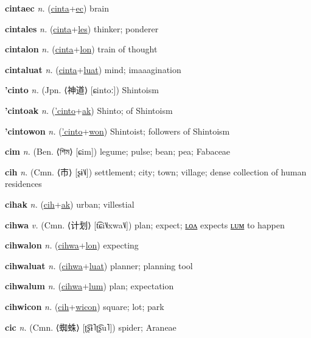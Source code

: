 \textbf{\hypertarget{cintaec}{cintaec}} \textit{n.} (\hyperlink{cinta}{cinta}+\allowbreak \hyperlink{ec}{ec})
brain

\textbf{\hypertarget{cintales}{cintales}} \textit{n.} (\hyperlink{cinta}{cinta}+\allowbreak \hyperlink{les}{les})
thinker; ponderer

\textbf{\hypertarget{cintalon}{cintalon}} \textit{n.} (\hyperlink{cinta}{cinta}+\allowbreak \hyperlink{lon}{lon})
train of thought

\textbf{\hypertarget{cintaluat}{cintaluat}} \textit{n.} (\hyperlink{cinta}{cinta}+\allowbreak \hyperlink{luat}{luat})
mind; imaaagination

\textbf{\hypertarget{'cinto}{'cinto}} \textit{n.} (Jpn. ⟨{\japanese{}神道}⟩ [ɕintoː])
Shintoism

\textbf{\hypertarget{'cintoak}{'cintoak}} \textit{n.} (\hyperlink{'cinto}{'cinto}+\allowbreak \hyperlink{ak}{ak})
Shinto; of Shintoism

\textbf{\hypertarget{'cintowon}{'cintowon}} \textit{n.} (\hyperlink{'cinto}{'cinto}+\allowbreak \hyperlink{won}{won})
Shintoist; followers of Shintoism

\textbf{\hypertarget{cim}{cim}} \textit{n.} (Ben. ⟨{\bengali{}শিম}⟩ [ɕim])
legume; pulse; bean; pea; Fabaceae

\textbf{\hypertarget{cih}{cih}} \textit{n.} (Cmn. ⟨{\chinese{}市}⟩ [ʂɨ˥˩])
settlement; city; town; village; dense collection of human residences

\textbf{\hypertarget{cihak}{cihak}} \textit{n.} (\hyperlink{cih}{cih}+\allowbreak \hyperlink{ak}{ak})
urban; villestial

\textbf{\hypertarget{cihwa}{cihwa}} \textit{v.} (Cmn. ⟨{\chinese{}计划}⟩ [t͡ɕi˥˩xwa˥˩])
plan; expect; \hyperlink{cihwalon}{ʟᴏᴧ} expects \hyperlink{cihwalum}{ʟᴜᴍ} to happen

\textbf{\hypertarget{cihwalon}{cihwalon}} \textit{n.} (\hyperlink{cihwa}{cihwa}+\allowbreak \hyperlink{lon}{lon})
expecting

\textbf{\hypertarget{cihwaluat}{cihwaluat}} \textit{n.} (\hyperlink{cihwa}{cihwa}+\allowbreak \hyperlink{luat}{luat})
planner; planning tool

\textbf{\hypertarget{cihwalum}{cihwalum}} \textit{n.} (\hyperlink{cihwa}{cihwa}+\allowbreak \hyperlink{lum}{lum})
plan; expectation

\textbf{\hypertarget{cihwicon}{cihwicon}} \textit{n.} (\hyperlink{cih}{cih}+\allowbreak \hyperlink{wicon}{wicon})
square; lot; park

\textbf{\hypertarget{cic}{cic}} \textit{n.} (Cmn. ⟨{\chinese{}蜘蛛}⟩ [ʈ͡ʂɨ˥ʈ͡ʂu˥])
spider; Araneae

